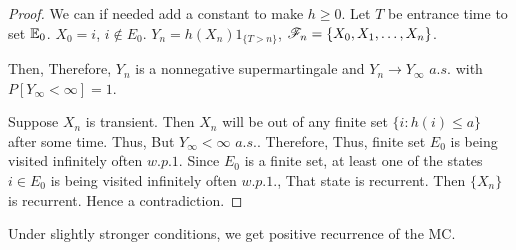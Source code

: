 \documentclass[all-lectures.tex]{subfiles}
\begin{document}
\begin{proof}
We can if needed add a constant to make $h \ge 0$. 
Let $T$ be entrance time to set $\mathbb{E}_0$.
$X_0=i$, \quad $i \notin E_0$. $Y_n = h(X_n) 1_{\{T>n\}}$, $\mathscr{F}_n = \{X_0, X_1, \dots, X_n\}$.

Then,
Therefore, $Y_n$ is a nonnegative supermartingale and $Y_n \to Y_\infty$ $a.s.$ with $P[Y_\infty < \infty] = 1$.

Suppose $X_n$ is transient. Then  $X_n$ will be out of any finite set $\{i:h(i) \le a\}$ after some time. Thus,
But $Y_\infty < \infty$  \quad $a.s.$.
Therefore,
Thus, finite set $E_0$ is being visited infinitely often $w.p. 1$.
Since $E_0$ is a finite set, at least one of the states $i \in E_0$ is being visited infinitely often $w.p.1$., That state is recurrent.
Then $\{X_n\}$ is recurrent. 
Hence a contradiction.
\end{proof}
Under slightly stronger conditions, we get positive recurrence of the MC.
\end{document}
